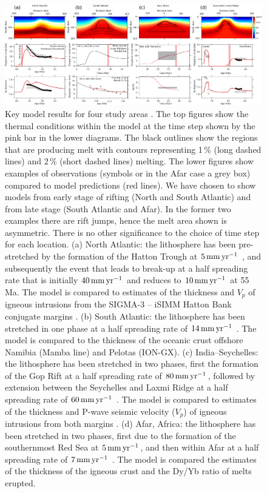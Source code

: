 \begin{figure}
\centering
\includegraphics[width=22.5cm]{./figures/ch2-mantle2.pdf}
\caption{Key model results for four study areas \citep[see][]{armitage-2018}. The top figures show the thermal conditions within the model at the time step shown by the pink bar in the lower diagrams. The black outlines show the regions that are producing melt with contours representing 1\,\% (long dashed lines) and 2\,\% (short dashed lines) melting. The lower figures show examples of observations (symbols or in the Afar case a grey box) compared to model predictions (red lines). We have chosen to show models from early stage of rifting (North and South Atlantic) and from late stage (South Atlantic and Afar). In the former two examples there are rift jumps, hence the melt area shown is asymmetric. There is no other significance to the choice of time step for each location. (a) North Atlantic: the lithosphere has been pre-stretched by the formation of the Hatton Trough at $5\rm\,mm\,yr^{-1}$ \citep[see][]{armitage-etal-2009}, and subsequently the event that leads to break-up at a half spreading rate that is initially $40\rm\,mm\,yr^{-1}$ and reduces to $10\rm\,mm\,yr^{-1}$ at 55\,Ma. The model is compared to estimates of the thickness and $V_{p}$ of igneous intrusions from the SIGMA-3 -- iSIMM Hatton Bank conjugate margins \citep{hopper-etal-2003,white-etal-2008}. (b) South Atlantic: the lithosphere has been stretched in one phase at a half spreading rate of $14\rm\,mm\,yr^{-1}$ \citep[see][]{taposeea-etal-2016}. The model is compared to the thickness of the oceanic crust offshore Namibia (Mamba line) and Pelotas (ION-GX). (c) India–Seychelles: the lithosphere has been stretched in two phases, first the formation of the Gop Rift at a half spreading rate of $80\rm\,mm\,yr^{-1}$, followed by extension between the Seychelles and Laxmi Ridge at a half spreading rate of $60\rm\,mm\,yr^{-1}$ \citep[see][]{armitage-etal-g3-2011}. The model is compared to estimates of the thickness and P-wave seismic velocity ($V_{p}$) of igneous intrusions from both margins \citep{collier-etal-2009,minshull-etal-2008}. (d) Afar, Africa: the lithosphere has been stretched in two phases, first due to the formation of the southernmost Red Sea at $5\rm\,mm\,yr^{-1}$, and then within Afar at a half spreading rate of $7\rm\,mm\,yr^{-1}$ \citep[see][]{armitage-etal-2015}. The model is compared the estimates of the thickness of the igneous crust and the Dy/Yb ratio of melts erupted.}
\label{fg:4models}
\end{figure}

